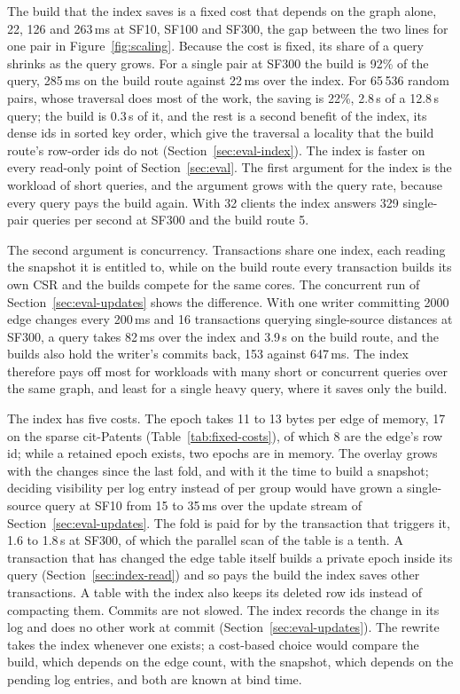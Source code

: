 The build that the index saves is a fixed cost that depends on the graph alone, 22, 126 and 263\,ms at SF10, SF100 and SF300, the gap between the two \duckpgq lines for one pair in Figure~\ref{fig:scaling}. Because the cost
is fixed, its share of a query shrinks as the query grows. For a single pair at SF300 the build is 92\% of the query, 285\,ms on the build route against 22\,ms over the index. For 65\,536 random pairs, whose traversal does most of the work, the saving is 22\%, 2.8\,s of a 12.8\,s query; the build is 0.3\,s of it, and the rest is a second benefit of the index, its dense ids in sorted key order, which give the traversal a locality that the build route's row-order ids do not (Section~\ref{sec:eval-index}). The index is
faster on every read-only point of Section~\ref{sec:eval}. The first argument for the index is the workload of short queries, and the argument grows with the query rate,
because every query pays the build again. With 32 clients the index answers 329 single-pair queries per second at SF300 and the build route 5.

The second argument is concurrency. Transactions share one index, each reading the snapshot it is entitled to,
while on the build route every transaction builds its own CSR and the builds compete for the same cores. The concurrent run of Section~\ref{sec:eval-updates} shows the
difference. With one writer committing 2000 edge changes every 200\,ms and 16 transactions querying single-source
distances at SF300, a query takes 82\,ms over the index and 3.9\,s on the build route, and the builds also hold the writer's commits back, 153 against 647\,ms. The index therefore pays off most for workloads with many short or concurrent queries over the same graph, and
least for a single heavy query, where it saves only the build.

The index has five costs. The epoch takes 11 to 13 bytes per edge of memory, 17 on the sparse cit-Patents (Table~\ref{tab:fixed-costs}), of which 8 are the edge's row id; while a retained epoch exists, two epochs are in memory. The
overlay grows with the changes since the last fold, and with it the time to build a snapshot; deciding visibility per
log entry instead of per group would have grown a single-source query at SF10 from 15 to 35\,ms over the update stream of Section~\ref{sec:eval-updates}. The fold is paid for by the
transaction that triggers it, 1.6 to 1.8\,s at SF300, of which the parallel scan of the table is a tenth. A transaction that has changed the edge table itself builds a private epoch inside its query
(Section~\ref{sec:index-read}) and so pays the build the index saves other transactions. A
table with the index also keeps its deleted row ids instead of compacting them. Commits are not slowed. The index records the change in its log and does no other work at commit (Section~\ref{sec:eval-updates}). The rewrite takes the index whenever one exists; a cost-based choice would compare the build, which depends on the edge count, with the snapshot, which depends on the pending log entries, and both are known at bind time.
